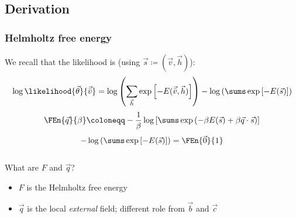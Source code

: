 \subsection{Derivation}
\begin{frame}
  \frametitle{Helmholtz free energy}
  We recall that the likelihood is (using \(\vec{s} \coloneqq (\vec{v},\vec{h})\)):
  \[
    \log\likelihood{\vec{\theta}}{\vec{\bar{v}}}
      = \log\left(\sum_{\vec{h}} \exp\left[-E(\vec{\bar{v}},\vec{h})\right]\right)
      - \log\left(\sums \exp\left[-E(\vec{s})\right]\right)
  \]
  \[
    \FEn{\vec{q}}{\beta} \coloneqq - \frac{1}{\beta}
    \log{\left[\sums \exp{\left(-\beta E(\vec{s}) + \beta \vec{q}\cdot\vec{s}\right)}\right]}
  \]
  \[
    - \log\left(\sums \exp\left[-E(\vec{s})\right]\right) = \FEn{\vec{0}}{1}
  \]
  \begin{columns}
    \begin{column}{0.80\textwidth}
      \begin{alertblock}{What are \(F\) and \(\vec{q}\)?}
        \begin{itemize}
          \item \(F\) is the Helmholtz free energy
          \item \(\vec{q}\) is the local \emph{external} field; different role from \(\vec{b}\) and \(\vec{c}\)
        \end{itemize}
      \end{alertblock}
    \end{column}
  \end{columns}
\end{frame}

